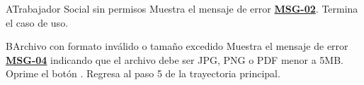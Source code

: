 \begin{UCtrayectoriaA}{A}{Trabajador Social sin permisos}
	\UCpaso Muestra el mensaje de error \hyperlink{mMSG02}{\bf MSG-02}.
	\UCpaso Termina el caso de uso.
\end{UCtrayectoriaA}

\begin{UCtrayectoriaA}{B}{Archivo con formato inválido o tamaño excedido}
	\UCpaso Muestra el mensaje de error \hyperlink{mMSG04}{\bf MSG-04} indicando que el archivo debe ser JPG, PNG o PDF menor a 5MB.
	\UCpaso[\UCactor] Oprime el botón .
	\UCpaso Regresa al paso 5 de la trayectoria principal.
\end{UCtrayectoriaA}

